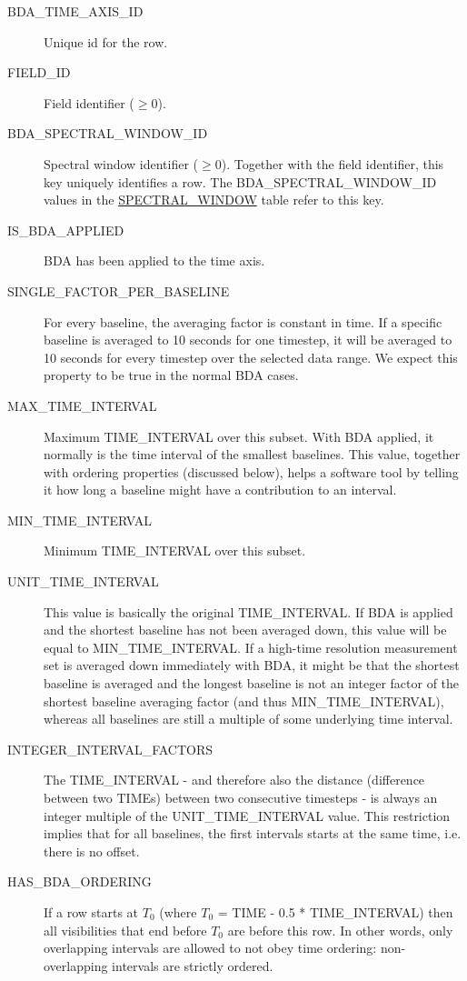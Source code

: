 \documentclass{article}
\begin{document}
\begin{description}

\item[BDA\_TIME\_AXIS\_ID] Unique id for the row.

\item[FIELD\_ID] Field identiﬁer ($\ge 0$).

\item[BDA\_SPECTRAL\_WINDOW\_ID]
Spectral window identifier ($\ge 0$). Together with the field identifier,
this key uniquely identifies a row.
The BDA\_SPECTRAL\_WINDOW\_ID values in the
\hyperref[tbl:spectral-window]{SPECTRAL\_WINDOW} table refer to this key.

\item[IS\_BDA\_APPLIED] BDA has been applied to the time axis.

\item[SINGLE\_FACTOR\_PER\_BASELINE]
For every baseline, the averaging factor is constant in time.
If a specific baseline is averaged to 10 seconds for one timestep, it will be
averaged to 10 seconds for every timestep over the selected data range.
We expect this property to be true in the normal BDA cases.

\item[MAX\_TIME\_INTERVAL]
Maximum TIME\_INTERVAL over this subset.
With BDA applied, it normally is the time interval of the smallest baselines.
This value, together with ordering properties (discussed below), helps a
software tool by telling it how long a baseline might have a contribution to
an interval.

\item[MIN\_TIME\_INTERVAL] Minimum TIME\_INTERVAL over this subset.

\item[UNIT\_TIME\_INTERVAL]
This value is basically the original TIME\_INTERVAL. If BDA is applied and the
shortest baseline has not been averaged down, this value will be equal to
MIN\_TIME\_INTERVAL. If a high-time resolution measurement set is averaged
down immediately with BDA, it might be that the shortest baseline is averaged
and the longest baseline is not an integer factor of the shortest baseline
averaging factor (and thus MIN\_TIME\_INTERVAL), whereas all baselines are
still a multiple of some underlying time interval.

\item[INTEGER\_INTERVAL\_FACTORS]

The TIME\_INTERVAL - and therefore also the distance
(difference between two TIMEs) between two consecutive timesteps - is
always an integer multiple of the UNIT\_TIME\_INTERVAL value.
This restriction implies that for all baselines,
the first intervals starts at the same time, i.e. there is no offset.

\item[HAS\_BDA\_ORDERING]
If a row starts at $T_0$ (where $T_0$ = TIME - 0.5 * TIME\_INTERVAL) then all
visibilities that end before $T_0$ are before this row.
In other words, only overlapping intervals are allowed to not obey time
ordering: non-overlapping intervals are strictly ordered.

\end{description}
\end{document}
